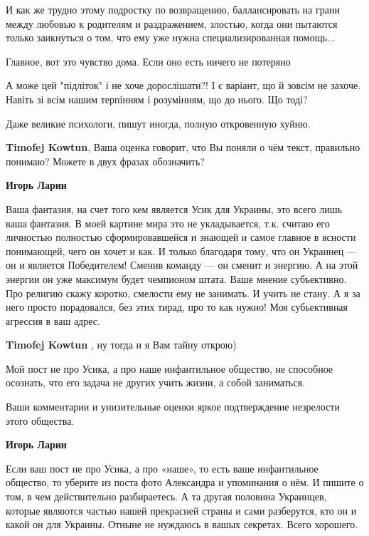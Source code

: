 \begin{itemize}
И как же трудно этому подростку по возвращению, баллансировать на грани между
любовью к родителям и раздражением, злостью, когда они пытаются только
заикнуться о том, что ему уже нужна специализированная помощь...

\begin{itemize} %
Главное, вот это чувство дома. Если оно есть ничего не потеряно
\end{itemize} %

А може цей "підліток" і не хоче дорослішати?! І є варіант, що й зовсім не захоче. Навіть зі всім нашим терпінням і розумінням, що до нього. Що тоді?

Даже великие психологи, пишут иногда, полную откровенную хуйню.

\begin{itemize} %
\textbf{Timofej Kowtun}, Ваша оценка говорит, что Вы поняли о чём текст, правильно понимаю?
Можете в двух фразах обозначить?

\textbf{Игорь Ларин} 

Ваша фантазия, на счет того кем является Усик для Украины, это всего лишь ваша
фантазия. В моей картине мира это не укладывается, т.к. считаю его личностью
полностью сформировавшейся и знающей и самое главное в ясности понимающей, чего
он хочет и как. И только благодаря тому, что он Украинец — он и является
Победителем! Сменив команду — он сменит и энергию. А на этой энергии он уже
максимум будет чемпионом штата. Ваше мнение субъективно. Про религию скажу
коротко, смелости ему не занимать. И учить не стану. А я за него просто
порадовался, без этих тирад, про то как нужно! Моя субьективная агрессия в ваш
адрес.

\textbf{Timofej Kowtun} , ну тогда и я Вам тайну открою)

Мой пост не про Усика, а про наше инфантильное общество, не способное осознать,
что его задача не других учить жизни, а собой заниматься.

Ваши комментарии и унизительные оценки яркое подтверждение незрелости этого общества.


\textbf{Игорь Ларин} 

Если ваш пост не про Усика, а про «наше», то есть ваше инфантильное общество,
то уберите из поста фото Александра и упоминания о нём. И пишите о том, в чем
действительно разбираетесь. А та другая половина Украинцев, которые являются
частью нашей прекрасней страны и сами разберутся, кто он и какой он для
Украины. Отныне не нуждаюсь в вашых секретах. Всего хорошего.


\end{itemize}
\end{itemize}
